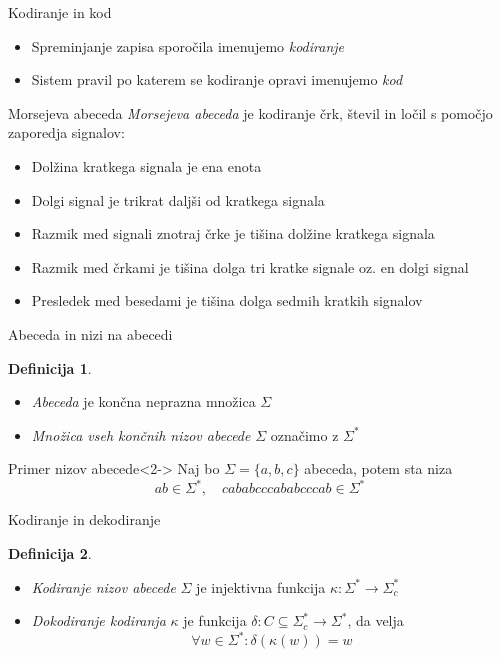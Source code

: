 \documentclass{beamer}
\theoremstyle{definition} %
\newtheorem{definicija}{Definicija}[section]
\begin{document}
\begin{frame}{Kodiranje in kod}
    \begin{itemize}
        \item<1-> Spreminjanje zapisa sporočila imenujemo \textit{kodiranje}
        \item<2-> Sistem pravil po katerem se kodiranje opravi imenujemo \textit{kod}
    \end{itemize}
\end{frame}

\begin{frame}{Morsejeva abeceda}
    \textit{Morsejeva abeceda} je kodiranje črk, števil in ločil s pomočjo zaporedja signalov:
    \begin{itemize}
        \item<2-> Dolžina kratkega signala je ena enota
        \item<3-> Dolgi signal je trikrat daljši od kratkega signala
        \item<4-> Razmik med signali znotraj črke je tišina dolžine kratkega signala
        \item<5-> Razmik med črkami je tišina dolga tri kratke signale oz. en dolgi signal
        \item<6-> Presledek med besedami je tišina dolga sedmih kratkih signalov
    \end{itemize}
\end{frame}

\begin{frame}{Abeceda in nizi na abecedi}
    \begin{definicija}
        \begin{itemize}
            \item \textit{Abeceda} je končna neprazna množica $ \Sigma $
            \item \textit{Množica vseh končnih nizov abecede} $ \Sigma $ označimo z $ \Sigma^* $
        \end{itemize}
    \end{definicija}    
    \begin{exampleblock}{Primer nizov abecede}<2->
    Naj bo $ \Sigma = \{ a,b,c \} $ abeceda, potem sta niza
    \[ 
        ab \in \Sigma^* , \quad cababcccababcccab \in \Sigma^*
    \]
    \end{exampleblock}
\end{frame}

\begin{frame}{Kodiranje in dekodiranje}
    \begin{definicija}
        \begin{itemize}
            \item \textit{Kodiranje nizov abecede} $ \Sigma $ je injektivna funkcija $ \kappa \colon \Sigma^* 
            \to \Sigma_c^* $
            \item<2-> \textit{Dokodiranje kodiranja} $ \kappa $ je funkcija 
            $ \delta \colon C \subseteq \Sigma^*_c \to \Sigma^* $, da velja
            \[
                \forall w \in \Sigma^* \colon \delta(\kappa(w)) = w
            \]
        \end{itemize}
    \end{definicija}
\end{frame}
\end{document}
